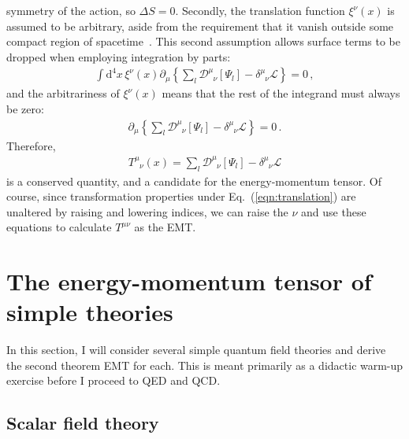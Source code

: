 \documentclass[prd,preprint,
  showpacs,showkeys,lengthcheck,
  nofootinbib,tightenlines,onecolumn,notitlepage,
  preprintnumbers,superscriptaddress]{revtex4-1}
\newcommand{\Lag}{\ensuremath{\mathscr{L}}}
\newcommand{\dx}{\ensuremath{\xi}}
\newcommand{\Tmunu}{\ensuremath{T^{\mu}_{\phantom{\mu}\nu}}}
\newcommand{\Dmunu}{\ensuremath{\mathscr{D}^{\mu}_{\phantom{\mu}\nu}}}
\newcommand{\gmunu}{\ensuremath{\delta^{\mu}_{\phantom{\mu}\nu}}}
\begin{document}
symmetry of the action, so $\Delta S = 0$.
Secondly, the translation function $\dx^\nu(x)$ is assumed to be arbitrary,
aside from the requirement that it vanish outside some compact region of
spacetime~\cite{Noether:1918zz}.
This second assumption allows surface terms to be dropped when employing
integration by parts:
\begin{align}
  \int \mathrm{d}^4x \,
  \dx^\nu(x)
  \partial_\mu
  \left\{
    \sum_l
    \mathscr{D}^{\mu}_{\phantom{\mu}\nu}[\Psi_l]
    -
    \delta^{\mu}_{\phantom{\mu}\nu} \Lag
    \right\}
  =
  0
  \,,
\end{align}
and the arbitrariness of $\dx^\nu(x)$ means that the rest of the integrand must
always be zero:
\begin{align}
  \partial_\mu
  \left\{
    \sum_l
    \mathscr{D}^{\mu}_{\phantom{\mu}\nu}[\Psi_l]
    -
    \delta^{\mu}_{\phantom{\mu}\nu} \Lag
    \right\}
  =
  0
  \,.
\end{align}
Therefore,
\begin{align}
  \label{eqn:emt:general}
  \Tmunu(x)
  =
  \sum_l
  \Dmunu[\Psi_l]
  -
  \gmunu \Lag
\end{align}
is a conserved quantity,
and a candidate for the energy-momentum tensor.
Of course, since transformation properties under Eq.~(\ref{eqn:translation})
are unaltered by raising and lowering indices, we can raise the $\nu$
and use these equations to calculate $T^{\mu\nu}$ as the EMT.



\section{The energy-momentum tensor of simple theories}
\label{sec:illustrate}

In this section, I will consider several simple quantum field theories
and derive the second theorem EMT for each.
This is meant primarily as a didactic warm-up exercise
before I proceed to QED and QCD.


\subsection{Scalar field theory}
\end{document}
